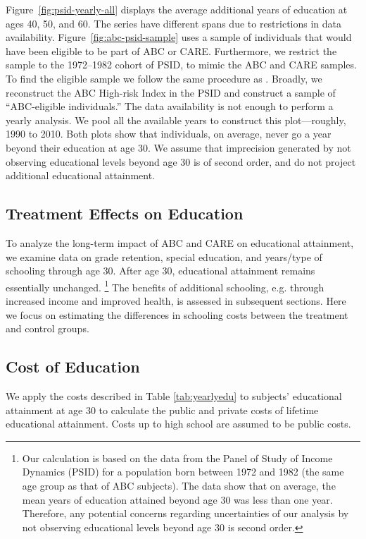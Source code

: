 \noindent Figure~\ref{fig:psid-yearly-all} displays the average additional years of education at ages 40, 50, and 60. The series have different spans due to restrictions in data availability. Figure~\ref{fig:abc-psid-sample} uses a sample of individuals that would have been eligible to be part of ABC or CARE. Furthermore, we restrict the sample to the 1972--1982 cohort of PSID, to mimic the ABC and CARE samples. To find the eligible sample we follow the same procedure as \citet{Garcia_Heckman_2014_AbilityCharacter}. Broadly, we reconstruct the ABC High-risk Index in the PSID and construct a sample of ``ABC-eligible individuals.'' The data availability is not enough to perform a yearly analysis. We pool all the available years to construct this plot---roughly, 1990 to 2010. Both plots show that individuals, on average, never go a year beyond their education at age 30. We assume that imprecision generated by not observing educational levels beyond age 30 is of second order, and do not project additional educational attainment. \\


\subsection{Treatment Effects on Education}
\noindent To analyze the long-term impact of ABC and CARE on educational attainment,
we examine data on grade retention, special education, and
years/type of schooling through age 30. After age 30,
educational attainment remains essentially
unchanged.%
	\footnote{Our calculation is based on
	the data from the Panel of Study of Income Dynamics (PSID) for a
	population born between 1972 and 1982 (the same age group as that of
	ABC subjects). The data show that on average, the mean years of education attained
	beyond age 30 was less than one year.
	Therefore, any potential concerns regarding uncertainties of our analysis
	by not observing educational levels beyond age 30 is second
	order.}
The benefits of additional schooling, e.g. through
increased income and improved health, is assessed in
subsequent sections. Here we focus on estimating the
differences in schooling costs between the treatment and
control groups. \\

\subsection{Cost of Education}
\noindent We apply the costs described in Table \ref{tab:yearlyedu} to subjects' educational attainment at age 30 to calculate the public and private costs of lifetime educational attainment. Costs up to high school are assumed to be public costs. \\

